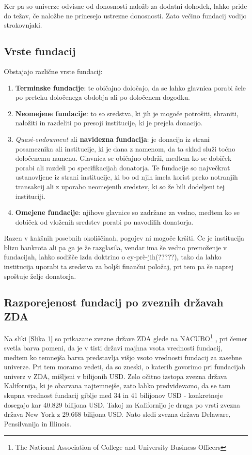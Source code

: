 \documentclass[12pt, a4paper]{article}
\begin{document}
Ker pa so univerze odvisne od donosnosti naložb za dodatni dohodek, lahko pride do težav, če naložbe ne prinesejo ustrezne donosnosti. Zato večino fundacij vodijo strokovnjaki.\\


\subsection{Vrste fundacij}
Obstajajo različne vrste fundacij:
\begin{enumerate}
\item \textbf{Terminske fundacije}: te običajno določajo, da se lahko glavnica porabi šele po preteku določenega obdobja ali po določenem dogodku.
\item \textbf{Neomejene fundacije}: to so sredstva, ki jih je mogoče potrošiti, shraniti, naložiti in razdeliti po presoji institucije, ki je prejela donacijo.
\item \textit{Quasi-endowment} ali \textbf{navidezna fundacija}: je donacija iz strani posameznika ali institucije, ki je dana z namenom, da ta sklad služi točno določenemu namenu. Glavnica se običajno obdrži, medtem ko se dobiček porabi ali razdeli po specifikacijah donatorja. Te fundacije so največkrat ustanovljene iz strani institucije, ki bo od njih imela korist preko notranjih transakcij ali z uporabo neomejenih sredstev, ki so že bili dodeljeni tej instituciji.
\item \textbf{Omejene fundacije}: njihove glavnice so zadržane za vedno, medtem ko se dobiček od vloženih sredstev porabi po navodilih donatorja.
\end{enumerate}

Razen v kakšnih posebnih okoliščinah, pogojev ni mogoče kršiti. Če je institucija blizu bankrota ali pa ga je že razglasila, vendar ima še vedno premoženje v fundacijah, lahko sodišče izda doktrino o cy-prè-jih(?????), tako da lahko institucija uporabi ta sredstva za boljši finančni položaj, pri tem pa še naprej spoštuje želje donatorja.

\subsection{Razporejenost fundacij po zveznih državah ZDA}

Na sliki \ref{Slika 1}  so prikazane zvezne države ZDA glede na NACUBO\footnote{The National Association of College and University Business Officers} \cite{wiki}, pri čemer svetla barva pomeni, da je v tisti državi majhna vsota vrednosti fundacij, medtem ko temnejša barva predstavlja višjo vsoto vrednosti fundacij za zasebne univerze. Pri tem moramo vedeti, da so zneski, o katerih govorimo pri fundacijah univerz v ZDA, mišljeni v bilijonih USD. Zelo očitno izstopa zvezna država Kalifornija, ki je obarvana najtemnejše, zato lahko predvidevamo, da se tam skupna vrednost fundacij giblje med 34 in 41 bilijonov USD - konkretneje dosegajo kar 40.829 bilijona USD. Takoj za Kalifornijo je druga po vrsti zvezna država New York z 29.668 bilijona USD. Nato sledi zvezna država Delaware, Pensilvanija in Illinois. \\
\end{document}
